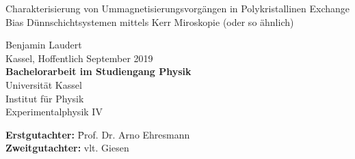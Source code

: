 \begin{titlepage} 
      \sffamily                                                     
\begin{center}                

{\Large \bfseries                                                                 
  \begin{onehalfspace}                                                           
   Charakterisierung von Ummagnetisierungsvorgängen in Polykristallinen Exchange Bias Dünnschichtsystemen mittels Kerr Miroskopie (oder so ähnlich)  \\[1cm]
  \end{onehalfspace}}                                                               

{\Large
Benjamin Laudert\\[0.5cm]
Kassel, Hoffentlich September 2019 \\[3cm]

{\bfseries Bachelorarbeit im Studiengang Physik}\\[0.5cm]       
Universität Kassel\\                                                                       
Institut für Physik\\                                                  
Experimentalphysik IV\\[1cm]}                                                                                                                                         
                                                                                          
\end{center}

\vfill

{\large                                                                                                                                                         
\begin{tabbing}
	\textbf{Erstgutachter:} \hspace{1cm} \= Prof. Dr. Arno Ehresmann \\
	\textbf{Zweitgutachter:} \> vlt. Giesen\\
\end{tabbing}}                                                 

\end{titlepage}    

\restoregeometry
 
\SetBgContents{}      